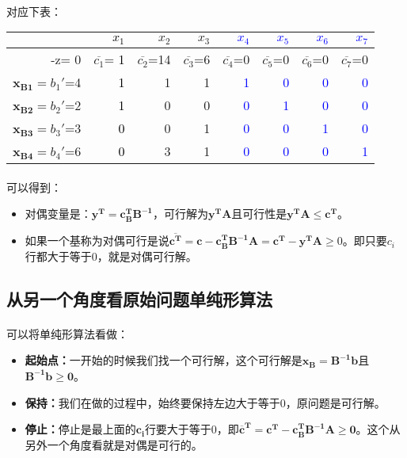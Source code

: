 		\paragraph{}对应下表：
				\begin{table}[h]
				\centering
\begin{tabular}{r|rrrrrrr}\hline
  & \textcolor{black}{$x_1$} & $x_2$ & $x_3$ & \textcolor{blue}{$x_4$} & \textcolor{blue}{$x_5$} & \textcolor{blue}{$x_6$} & \textcolor{blue}{$x_7$}\\
\hline
 -z= 0 & $\overline{c_1}$= \textcolor{black}{1}  & $\overline{c_2}$=14 & $\overline{c_3}$=6 & $\overline{c_4}$=0 & $\overline{c_5}$=0 & $\overline{c_6}$=0 & $\overline{c_7}$=0 \\
 \hline
 $\mathbf{x_{B1}} = b_1'$=4 & \textcolor{black}{1} & 1 & 1 & \textcolor{blue}{1} & \textcolor{blue}{0} & \textcolor{blue}{0} & \textcolor{blue}{0} \\
 $\mathbf{x_{B2}} = b_2'$=2 & \textcolor{black}{1} & 0 & 0 & \textcolor{blue}{0} & \textcolor{blue}{1} & \textcolor{blue}{0} & \textcolor{blue}{0} \\
 $\mathbf{x_{B3}} = b_3'$=3 & \textcolor{black}{0} & 0 & 1 & \textcolor{blue}{0} & \textcolor{blue}{0} & \textcolor{blue}{1} & \textcolor{blue}{0} \\
 $\mathbf{x_{B4}} = b_4'$=6 & \textcolor{black}{0} & 3 & 1 & \textcolor{blue}{0} & \textcolor{blue}{0} & \textcolor{blue}{0} & \textcolor{blue}{1} \\
\hline
\end{tabular}
\end{table}
		\paragraph{}可以得到：
		\begin{itemize}
			\item 对偶变量是：$\mathbf{ y^T=c_B^T B^{-1} }$，可行解为$\mathbf{ y^T A}$且可行性是$\mathbf{ y^T A  \leq c^T }$。
			\item 如果一个基称为对偶可行是说$\mathbf{\overline{c^T}=c-c_B^TB^{-1}A=c^T-y^TA} \geq 0$。即只要$c_i$行都大于等于0，就是对偶可行解。
		\end{itemize}
	\subsection{从另一个角度看原始问题单纯形算法}
		\paragraph{}可以将单纯形算法看做：
		\begin{itemize}
			\item \textbf{起始点：}一开始的时候我们找一个可行解，这个可行解是$\mathbf{ x_B = B^{-1}b}$且$\mathbf{B^{-1}b \geq 0 }$。
			\item \textbf{保持：}我们在做的过程中，始终要保持左边大于等于0，原问题是可行解。
			\item \textbf{停止：}停止是最上面的$\mathbf{c_i}$行要大于等于0，即$\mathbf{ \overline{c}^T = c^T - c_B^T B^{-1} A \geq 0 }$。这个从另外一个角度看就是对偶是可行的。
		\end{itemize}
